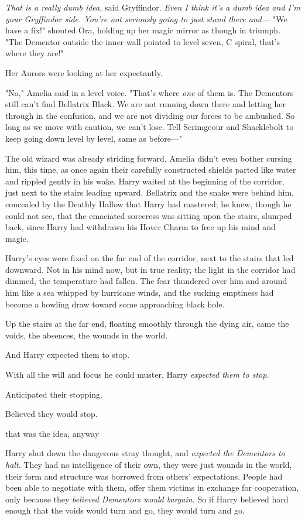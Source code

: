 {\el}

\emph{That is a really dumb idea,} said Gryffindor. \emph{Even I think it's a
dumb idea and I'm your Gryffindor side. You're not seriously going to just
stand there and—}
\sbreak
"We have a fix!" shouted Ora, holding up her magic mirror as though in triumph.
"The Dementor outside the inner wall pointed to level seven, C spiral, that's
where they are!"

Her Aurors were looking at her expectantly.

"No," Amelia said in a level voice. "That's where \emph{one} of them is. The
Dementors still can't find Bellatrix Black. We are not running down there and
letting her through in the confusion, and we are not dividing our forces to be
ambushed. So long as we move with caution, we can't lose. Tell Scrimgeour and
Shacklebolt to keep going down level by level, same as before—"

The old wizard was already striding forward. Amelia didn't even bother cursing
him, this time, as once again their carefully constructed shields parted like
water and rippled gently in his wake.
\sbreak
Harry waited at the beginning of the corridor, just next to the stairs leading
upward. Bellatrix and the snake were behind him, concealed by the Deathly
Hallow that Harry had mastered; he knew, though he could not see, that the
emaciated sorceress was sitting upon the stairs, slumped back, since Harry had
withdrawn his Hover Charm to free up his mind and magic.

Harry's eyes were fixed on the far end of the corridor, next to the stairs that
led downward. Not in his mind now, but in true reality, the light in the
corridor had dimmed, the temperature had fallen. The fear thundered over him
and around him like a sea whipped by hurricane winds, and the sucking emptiness
had become a howling draw toward some approaching black hole.

Up the stairs at the far end, floating smoothly through the dying air, came the
voids, the absences, the wounds in the world.

And Harry expected them to stop.

With all the will and focus he could muster, Harry \emph{expected them to stop.}

Anticipated their stopping.

Believed they would stop.

{\el} that was the idea, anyway{\el}

Harry shut down the dangerous stray thought, and \emph{expected the Dementors
to halt.} They had no intelligence of their own, they were just wounds in the
world, their form and structure was borrowed from others' expectations. People
had been able to negotiate with them, offer them victims in exchange for
cooperation, only because they \emph{believed Dementors would bargain.} So if
Harry believed hard enough that the voids would turn and go, they would turn
and go.

